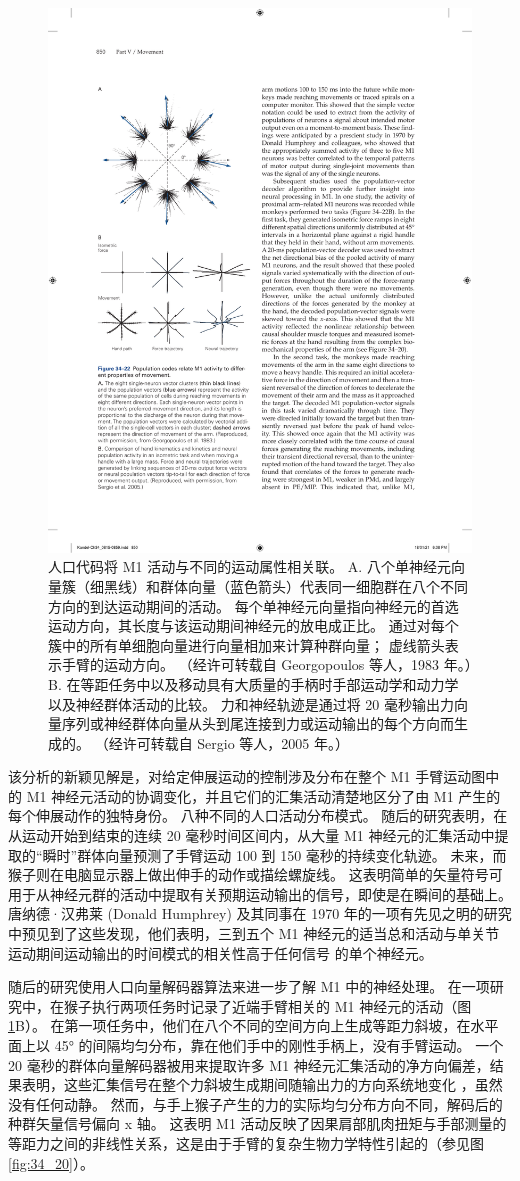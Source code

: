 \begin{figure}[htbp]
	\centering
	\includegraphics[width=0.5\linewidth]{chap34/fig_34_22}
	\caption{人口代码将 M1 活动与不同的运动属性相关联。 A. 八个单神经元向量簇（细黑线）和群体向量（蓝色箭头）代表同一细胞群在八个不同方向的到达运动期间的活动。 每个单神经元向量指向神经元的首选运动方向，其长度与该运动期间神经元的放电成正比。 通过对每个簇中的所有单细胞向量进行向量相加来计算种群向量； 虚线箭头表示手臂的运动方向。 （经许可转载自 Georgopoulos 等人，1983 年。）B. 在等距任务中以及移动具有大质量的手柄时手部运动学和动力学以及神经群体活动的比较。 力和神经轨迹是通过将 20 毫秒输出力向量序列或神经群体向量从头到尾连接到力或运动输出的每个方向而生成的。 （经许可转载自 Sergio 等人，2005 年。）}
	\label{fig:34_22}
\end{figure}

该分析的新颖见解是，对给定伸展运动的控制涉及分布在整个 M1 手臂运动图中的 M1 神经元活动的协调变化，并且它们的汇集活动清楚地区分了由 M1 产生的每个伸展动作的独特身份。 八种不同的人口活动分布模式。 随后的研究表明，在从运动开始到结束的连续 20 毫秒时间区间内，从大量 M1 神经元的汇集活动中提取的“瞬时”群体向量预测了手臂运动 100 到 150 毫秒的持续变化轨迹。 未来，而猴子则在电脑显示器上做出伸手的动作或描绘螺旋线。 这表明简单的矢量符号可用于从神经元群的活动中提取有关预期运动输出的信号，即使是在瞬间的基础上。 唐纳德·汉弗莱 (Donald Humphrey) 及其同事在 1970 年的一项有先见之明的研究中预见到了这些发现，他们表明，三到五个 M1 神经元的适当总和活动与单关节运动期间运动输出的时间模式的相关性高于任何信号 的单个神经元。

随后的研究使用人口向量解码器算法来进一步了解 M1 中的神经处理。 在一项研究中，在猴子执行两项任务时记录了近端手臂相关的 M1 神经元的活动（图 \ref{fig:34_22}B）。 在第一项任务中，他们在八个不同的空间方向上生成等距力斜坡，在水平面上以 45° 的间隔均匀分布，靠在他们手中的刚性手柄上，没有手臂运动。 一个 20 毫秒的群体向量解码器被用来提取许多 M1 神经元汇集活动的净方向偏差，结果表明，这些汇集信号在整个力斜坡生成期间随输出力的方向系统地变化 ，虽然没有任何动静。 然而，与手上猴子产生的力的实际均匀分布方向不同，解码后的种群矢量信号偏向 x 轴。 这表明 M1 活动反映了因果肩部肌肉扭矩与手部测量的等距力之间的非线性关系，这是由于手臂的复杂生物力学特性引起的（参见图 \ref{fig:34_20}）。

